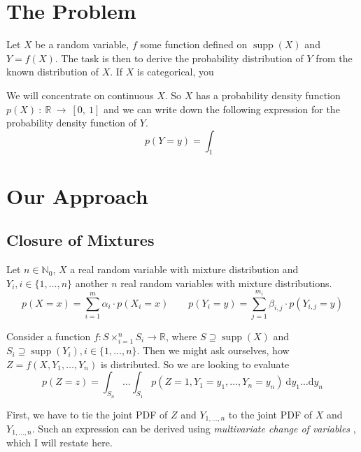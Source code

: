 \documentclass[11pt,a4paper]{book}
\DeclareMathOperator{\supp}{supp}
\begin{document}
\chapter{The Problem}
\label{ch:problem}

Let $X$ be a random variable, $f$ some function defined on $\supp(X)$ and
$Y = f(X)$. The task is then to derive the probability distribution of $Y$ from
the known distribution of $X$. If $X$ is categorical, you

We will concentrate on continuous $X$. So $X$ has a probability density function
$p(X)~:~\mathbb{R}~\rightarrow~[0,~1]$ and we can write down the following
expression for the probability density function of $Y$.
\begin{equation*}
  p(Y = y) = \int_{1}
\end{equation*}

\chapter{Our Approach}
\label{ch:theory}

\section{Closure of Mixtures}

Let $n \in \mathbb{N}_{0}$, $X$ a real random variable with mixture distribution
and $Y_{i}, i \in \{ 1, \dots, n \}$ another $n$ real random variables with
mixture distributions.
\begin{equation*}
  p(X = x) = \sum_{i = 1}^{m} \alpha_{i} \cdot p(X_{i} = x) \qquad p(Y_{i} = y) = \sum_{j = 1}^{m_{i}} \beta_{i,j} \cdot p(Y_{i,j} = y)
\end{equation*}

Consider a function $f : S \times_{i = 1}^{n} S_{i} \rightarrow \mathbb{R}$,
where $S \supseteq \supp(X)$ and
$S_{i} \supseteq \supp(Y_{i}), i \in \{ 1, \dots, n \}$. Then we might ask
ourselves, how $Z = f(X, Y_{1}, \dots, Y_{n})$ is distributed. So we are looking
to evaluate
\begin{equation*}
  p(Z = z) = \int_{S_{n}}\dots\int_{S_{1}} p(Z = 1, Y_{1} = y_{1}, \dots, Y_{n} = y_{n})~\mathrm{d}y_{1}\dots\mathrm{d}y_{n}
\end{equation*}

First, we have to tie the joint PDF of $Z$ and $Y_{1, \dots, n}$ to the joint
PDF of $X$ and $Y_{1, \dots, n}$. Such an expression can be derived using
\emph{multivariate change of variables} \cite[chapter~2.6.2.1]{murphy}, which I
will restate here.
\end{document}
